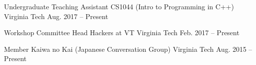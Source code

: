 

\begin{cvhonors}

  \cvhonor
    {Undergraduate Teaching Assistant} %
    {CS1044 (Intro to Programming in C++)} %
    {Virginia Tech} %
    {Aug. 2017 – Present} %

  \cvhonor
    {Workshop Committee Head} %
    {Hackers at VT} %
    {Virginia Tech} %
    {Feb. 2017 – Present} %

  \cvhonor
    {Member} %
    {Kaiwa no Kai (Japanese Conversation Group)} %
    {Virginia Tech} %
    {Aug. 2015 – Present} %

\end{cvhonors}
